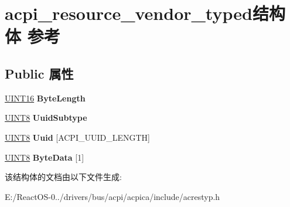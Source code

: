 \hypertarget{structacpi__resource__vendor__typed}{}\section{acpi\+\_\+resource\+\_\+vendor\+\_\+typed结构体 参考}
\label{structacpi__resource__vendor__typed}
\subsection*{Public 属性}
\begin{DoxyCompactItemize}
\item 
\mbox{\label{structacpi__resource__vendor__typed_a21908e7798e05b4328307e2590b09beb}} 
\hyperlink{_processor_bind_8h_a09f1a1fb2293e33483cc8d44aefb1eb1}{U\+I\+N\+T16} {\bfseries Byte\+Length}
\item 
\mbox{\label{structacpi__resource__vendor__typed_a3670882dd3c9f1135a121fc8f1435d8f}} 
\hyperlink{_processor_bind_8h_ab27e9918b538ce9d8ca692479b375b6a}{U\+I\+N\+T8} {\bfseries Uuid\+Subtype}
\item 
\mbox{\label{structacpi__resource__vendor__typed_aa6a883a9084f5f01cb618e3ee4242e5d}} 
\hyperlink{_processor_bind_8h_ab27e9918b538ce9d8ca692479b375b6a}{U\+I\+N\+T8} {\bfseries Uuid} \mbox{[}A\+C\+P\+I\+\_\+\+U\+U\+I\+D\+\_\+\+L\+E\+N\+G\+TH\mbox{]}
\item 
\mbox{\label{structacpi__resource__vendor__typed_a3ed677f4271bf4875fe9a07bf959432a}} 
\hyperlink{_processor_bind_8h_ab27e9918b538ce9d8ca692479b375b6a}{U\+I\+N\+T8} {\bfseries Byte\+Data} \mbox{[}1\mbox{]}
\end{DoxyCompactItemize}


该结构体的文档由以下文件生成\+:\begin{DoxyCompactItemize}
\item 
E\+:/\+React\+O\+S-\/0../drivers/bus/acpi/acpica/include/acrestyp.\+h\end{DoxyCompactItemize}

